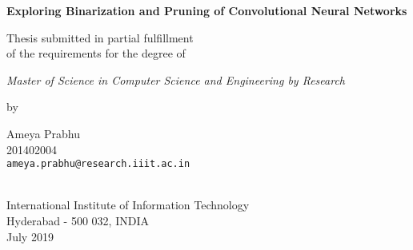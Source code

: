 \thispagestyle{empty}
\begin{center}
\vspace*{1.5cm}
{\Large \bf Exploring Binarization and Pruning of Convolutional Neural Networks}

\vspace*{3.75cm}
{\large Thesis submitted in partial fulfillment\\}
{\large  of the requirements for the degree of \\}

\vspace*{1cm}
{\it {\large Master of Science in Computer Science and Engineering by Research} \\
}

\vspace*{1cm}
{\large by}

\vspace*{5mm}
{\large Ameya Prabhu\\}
{\large 201402004\\
{\small \tt ameya.prabhu@research.iiit.ac.in}}

\vspace*{4.0cm}
{\\}
{\large International Institute of Information Technology\\}
{\large Hyderabad - 500 032, INDIA\\}
{\large July 2019\\}
\end{center}
